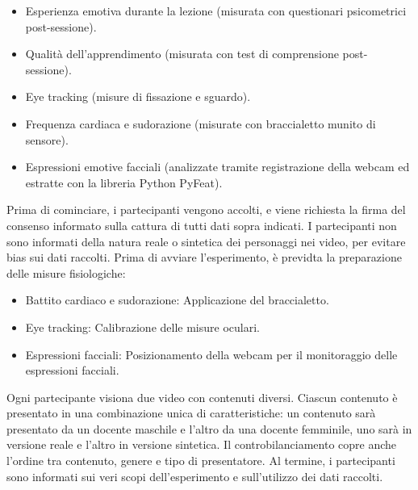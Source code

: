\begin{itemize}
    \item Esperienza emotiva durante la lezione (misurata con questionari psicometrici post-sessione).
    \item Qualità dell’apprendimento (misurata con test di comprensione post-sessione).
    \item Eye tracking (misure di fissazione e sguardo).
    \item Frequenza cardiaca e sudorazione (misurate con braccialetto munito di sensore).
    \item Espressioni emotive facciali (analizzate tramite registrazione della webcam ed estratte con la libreria Python PyFeat).
\end{itemize}

Prima di cominciare, i partecipanti vengono accolti, e viene richiesta la firma del consenso informato sulla cattura di tutti dati sopra indicati. I partecipanti non sono informati della natura reale o sintetica dei personaggi nei video, per evitare bias sui dati raccolti. Prima di avviare l'esperimento, è previdta la preparazione delle misure fisiologiche:
\begin{itemize}
    \item Battito cardiaco e sudorazione: Applicazione del braccialetto.
    \item Eye tracking: Calibrazione delle misure oculari.
    \item Espressioni facciali: Posizionamento della webcam per il monitoraggio delle espressioni facciali.
\end{itemize}

Ogni partecipante visiona due video con contenuti diversi. Ciascun contenuto è presentato in una combinazione unica di caratteristiche: un contenuto sarà presentato da un docente maschile e l’altro da una docente femminile, uno sarà in versione reale e l’altro in versione sintetica. Il controbilanciamento copre anche l'ordine tra contenuto, genere e tipo di presentatore. Al termine, i partecipanti sono informati sui veri scopi dell’esperimento e sull’utilizzo dei dati raccolti.

\clearpage